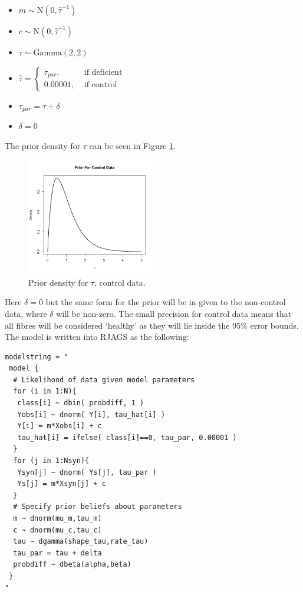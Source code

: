 \documentclass[a4paper, 12pt]{article}
\begin{document}
\begin{minipage}{0.5\textwidth}
    \begin{itemize}
        \item[] $m\sim\text{N}\left(0, \hat{\tau}^{-1} \right)$ 
        \item[] $c\sim\text{N}\left(0, \hat{\tau}^{-1} \right)$
        \item[] $\tau \sim \text{Gamma}\left(2,2\right)$
    \end{itemize}
\end{minipage}
\begin{minipage}{0.5\textwidth}
    \begin{itemize}
        \item[] $\hat{\tau} = \begin{cases} \tau_{par},&\text{ if deficient }\\0.00001,&\text{ if control } \end{cases}$ 
        \item[] $\tau_{par} = \tau + \delta $
        \item[] $\delta =0 $
    \end{itemize}
\end{minipage}
The prior density for $\tau$ can be seen in Figure \ref{fig:tau_prior_ctrl}.
\begin{figure}[H]
    \centering
    \includegraphics[width=0.5\textwidth]{tau_prior_ctrl.png}
    \caption{Prior density for $\tau$, control data.}
    \label{fig:tau_prior_ctrl}
\end{figure}
Here $\delta=0$ but the same form for the prior will be in given to the non-control data, where $\delta$ will be non-zero. The small precision for control data means that all fibres will be considered `healthy' as they will lie inside the 95\% error bounds. The model is written into RJAGS as the following:
\begin{lstlisting}
modelstring = "
 model {
  # Likelihood of data given model parameters
  for (i in 1:N){
   class[i] ~ dbin( probdiff, 1 )
   Yobs[i] ~ dnorm( Y[i], tau_hat[i] )
   Y[i] = m*Xobs[i] + c
   tau_hat[i] = ifelse( class[i]==0, tau_par, 0.00001 ) 
  }
  for (j in 1:Nsyn){
   Ysyn[j] ~ dnorm( Ys[j], tau_par )
   Ys[j] = m*Xsyn[j] + c
  }
  # Specify prior beliefs about parameters
  m ~ dnorm(mu_m,tau_m)
  c ~ dnorm(mu_c,tau_c)
  tau ~ dgamma(shape_tau,rate_tau)
  tau_par = tau + delta
  probdiff ~ dbeta(alpha,beta)  
 }
"
\end{lstlisting}
\end{document}
